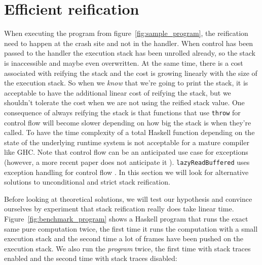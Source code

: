 \section{Efficient reification} \label{sec:lazy_reification}

When executing the program from figure~\ref{fig:sample_program}, the reification need to happen at the crash site and
not in the handler. When control has been passed to the handler the
execution stack has been unrolled already, so the stack is inaccessible
and maybe even overwritten. At the same time, there is a cost associated
with reifying the stack and the cost is growing linearly with the size
of the execution stack. So when we \emph{know} that we're going to print
the stack, it is acceptable to have the additional linear cost of
reifying the stack, but we shouldn't tolerate the cost when we are not
using the reified stack value. One consequence of always reifying the
stack is that functions that use \texttt{throw} for control flow will
become slower depending on how big the stack is when they're called.
To have the time complexity of a total Haskell function depending on
the state of the underlying runtime system is not acceptable for a mature
compiler like GHC. Note that control flow can be an anticipated use case for
exceptions \cite{peyton1999semantics} (however, a more recent paper
does not anticipate it \cite{marlow2006extensible}). \texttt{lazyReadBuffered} uses exception handling
for control flow \cite{github_lazyReadBuffered_control_flow}.
In this section we will look for alternative solutions
to unconditional and strict stack reification.

Before looking at theoretical solutions, we will test our hypothesis
and convince ourselves by experiment that stack reification really does
take linear time. Figure~\ref{fig:benchmark_program} shows a Haskell
program that runs the exact same pure computation twice, the first time
it runs the computation with a small execution stack and the second time
a lot of frames have been pushed on the execution stack. We also run the
\emph{program} twice, the first time with stack traces enabled and the
second time with stack traces disabled:

